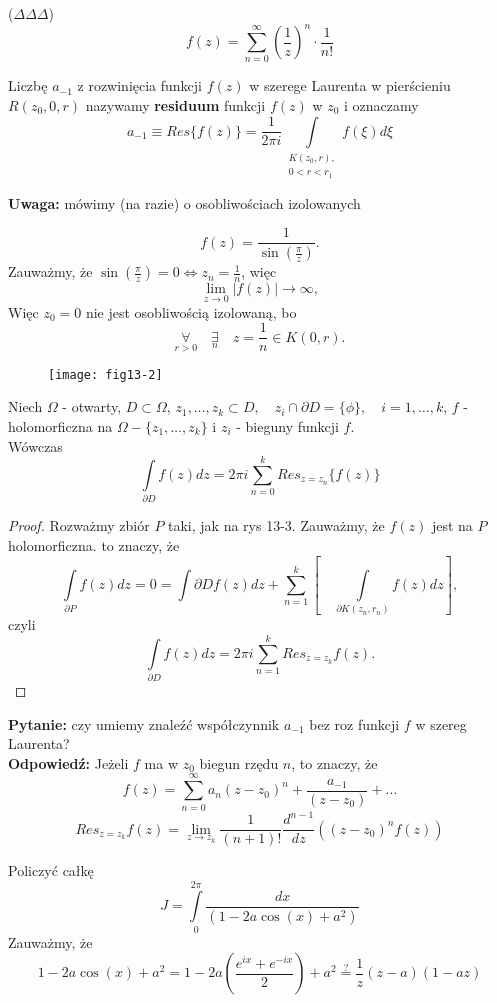\documentclass[../main.tex]{subfiles}
\begin{document}
\begin{przyklad}
    ($\Delta\Delta\Delta$)\\
    \[
        f(z) = \sum_{n = 0}^\infty \left(\frac{1}{z}\right)^n \cdot \frac{1}{n!}
    \]
\end{przyklad}
\begin{definicja}
    Liczbę $a_{-1}$ z rozwinięcia funkcji $f(z)$ w szerege Laurenta w pierścieniu $R(z_0, 0, r)$ nazywamy \textbf{residuum} funkcji $f(z)$ w $z_0$ i oznaczamy
    \[
        a_{-1} \equiv Res\{f(z)\} = \frac{1}{2\pi i} \int\limits_{\substack{K(z_0,r),\\ 0<r<r_1}} f(\xi)d\xi
    \]
\end{definicja}
\textbf{Uwaga: } mówimy (na razie) o osobliwościach izolowanych
\begin{przyklad}
    \[
        f(z) = \frac{1}{\sin\left(\frac{\pi}{z}\right)}
    .\]
Zauważmy, że $\sin\left(\frac{\pi}{z}\right) = 0 \iff z_n = \frac{1}{n}$, więc
    \[
        \lim\limits_{z\to 0}|f(z)| \to \infty,
    \]
    Więc $z_0 = 0$ nie jest osobliwością izolowaną, bo
    \[
        \underset{r > 0}{\forall}\quad\underset{n}{\exists}\quad z = \frac{1}{n}\in K(0,r).
    \]
\end{przyklad}
\begin{figure}[h]
    \centering
    \texttt{[image: fig13-2]}
\end{figure}
\begin{tw}
Niech $\Omega$ - otwarty, $D\subset \Omega$, $z_1,\dots,z_k\subset D,\quad z_i\cap \partial D = \{\phi\},\quad i = 1,\dots,k$, $f$ - holomorficzna na $\Omega - \{z_1,\dots,z_k\}$ i $z_i$ - bieguny funkcji $f$.\\
Wówczas
    \[
        \int\limits_{\partial D} f(z)dz = 2 \pi i \sum_{n=0}^k Res_{z = z_n}\{f(z)\}
    \]
\end{tw}
\begin{proof}
Rozważmy zbiór $P$ taki, jak na rys 13-3.
    Zauważmy, że $f(z)$ jest na $P$ holomorficzna. to znaczy, że
    \[
        \int\limits_{\partial P}f(z) dz = 0 = \int\limits{\partial D}f(z)dz + \sum_{n=1}^k \left[\quad\int\limits_{\partial K(z_n, r_n)}f(z) dz\right],
    \]
    czyli
    \[
        \int\limits_{\partial D} f(z) dz = 2 \pi i\sum_{n=1}^k Res_{z = z_k} f(z)
    .\]
\end{proof}
\textbf{Pytanie:} czy umiemy znaleźć współczynnik $a_{-1}$ bez roz funkcji $f$ w szereg Laurenta?\\
\textbf{Odpowiedź:} Jeżeli $f$ ma w $z_0$ biegun rzędu $n$, to znaczy, że
\[
    f(z) = \sum_{n=0}^\infty a_n(z-z_0)^n + \frac{a_{-1}}{(z-z_0)} + \dots
\]
\[
    Res_{z = z_k}f(z) = \lim\limits_{z\to z_k} \frac{1}{(n+1)!} \frac{d^{n-1}}{dz}\left((z-z_0)^nf(z)\right)
\]
\begin{przyklad}
    Policzyć całkę
    \[
        J = \int\limits_0^{2\pi} \frac{dx}{(1-2a\cos(x)+a^2)}
    \]
    Zauważmy, że
    \[
        1 - 2a \cos(x) + a^2 = 1 - 2a\left( \frac{e^{ix} + e^{-ix}}{2}\right) + a^2 \overset{?}{=} \frac{1}{z} (z-a)(1-az)
    \]
\end{przyklad}
\end{document}

